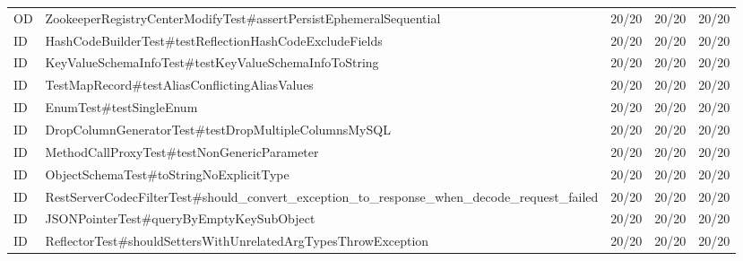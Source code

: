 \begin{table}[t]
\begin{tabular}{lllll}
OD & ZookeeperRegistryCenterModifyTest\#assertPersistEphemeralSequential & 20/20 & 20/20 & 20/20 \\
ID & HashCodeBuilderTest\#testReflectionHashCodeExcludeFields & 20/20 & 20/20 & 20/20 \\
ID & KeyValueSchemaInfoTest\#testKeyValueSchemaInfoToString & 20/20 & 20/20 & 20/20 \\
ID & TestMapRecord\#testAliasConflictingAliasValues & 20/20 & 20/20 & 20/20 \\
ID & EnumTest\#testSingleEnum & 20/20 & 20/20 & 20/20 \\
ID & DropColumnGeneratorTest\#testDropMultipleColumnsMySQL & 20/20 & 20/20 & 20/20 \\
ID & MethodCallProxyTest\#testNonGenericParameter & 20/20 & 20/20 & 20/20 \\
ID & ObjectSchemaTest\#toStringNoExplicitType & 20/20 & 20/20 & 20/20 \\
ID & RestServerCodecFilterTest\#should\_convert\_exception\_to\_response\_when\_decode\_request\_failed & 20/20 & 20/20 & 20/20 \\
ID & JSONPointerTest\#queryByEmptyKeySubObject & 20/20 & 20/20 & 20/20 \\
ID & ReflectorTest\#shouldSettersWithUnrelatedArgTypesThrowException & 20/20 & 20/20 & 20/20 \\
\bottomrule
\end{tabular}
\end{table}
